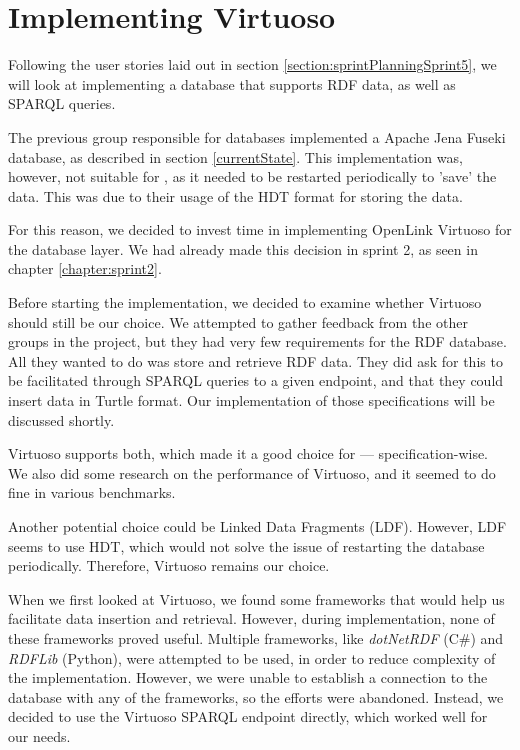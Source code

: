 \section{Implementing Virtuoso}
Following the user stories laid out in section \ref{section:sprintPlanningSprint5}, we will look at implementing a database that supports RDF data, as well as SPARQL queries.

The previous group responsible for \knox{} databases implemented a Apache Jena Fuseki database, as described in section \ref{currentState}.
This implementation was, however, not suitable for \knox{}, as it needed to be restarted periodically to 'save' the data. This was due to their usage of the HDT format for storing the data\cite{knox2020}.

For this reason, we decided to invest time in implementing OpenLink Virtuoso\cite{OpenLinkSoftwareVirtuoso} for the \knox{} database layer. We had already made this decision in sprint 2, as seen in chapter \ref{chapter:sprint2}.

Before starting the implementation, we decided to examine whether Virtuoso should still be our choice.
We attempted to gather feedback from the other groups in the \knox{} project, but they had very few requirements for the RDF database. All they wanted to do was store and retrieve RDF data.
They did ask for this to be facilitated through SPARQL queries to a given endpoint, and that they could insert data in Turtle format. Our implementation of those specifications will be discussed shortly.

Virtuoso supports both, which made it a good choice for \knox{} --- specification-wise. We also did some research on the performance of Virtuoso, and it seemed to do fine in various benchmarks\cite{addleseeComparingLinkedData2019}\cite{jovanovikBenchmarkingVirtuosoMighty2018}.

Another potential choice could be Linked Data Fragments (LDF). However, LDF seems to use HDT, which would not solve the issue of restarting the database periodically. Therefore, Virtuoso remains our choice.

When we first looked at Virtuoso, we found some frameworks that would help us facilitate data insertion and retrieval.  However, during implementation, none of these frameworks proved useful. Multiple frameworks, like \textit{dotNetRDF} (C\#) and \textit{RDFLib} (Python), were attempted to be used, in order to reduce complexity of the implementation. However, we were unable to establish a connection to the database with any of the frameworks, so the efforts were abandoned. Instead, we decided to use the Virtuoso SPARQL endpoint directly, which worked well for our needs.

